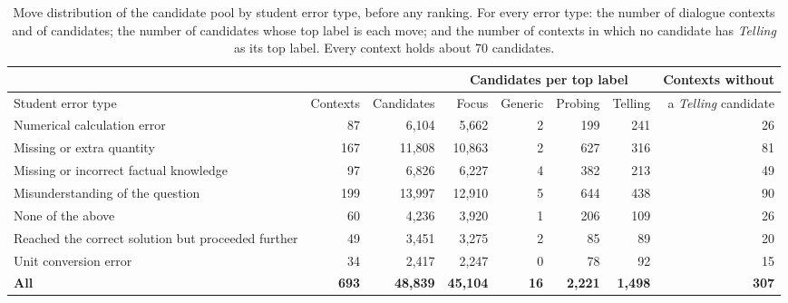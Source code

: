 \begin{table}[!t]
    \centering
    \footnotesize
    \setlength{\tabcolsep}{4pt}
    \renewcommand{\arraystretch}{1.08}
    \captionsetup{skip=4pt}
    \begin{tabularx}{\linewidth}{@{}>{\raggedright\arraybackslash}Xrrrrrrr@{}}
        \toprule
        & & & \multicolumn{4}{c}{Candidates per top label} & Contexts without \\
        \cmidrule(lr){4-7}
        Student error type & Contexts & Candidates & Focus & Generic & Probing & Telling & a \textit{Telling} candidate \\
        \midrule
        Numerical calculation error & 87 & 6,104 & 5,662 & 2 & 199 & 241 & 26 \\
        Missing or extra quantity & 167 & 11,808 & 10,863 & 2 & 627 & 316 & 81 \\
        Missing or incorrect factual knowledge & 97 & 6,826 & 6,227 & 4 & 382 & 213 & 49 \\
        Misunderstanding of the question & 199 & 13,997 & 12,910 & 5 & 644 & 438 & 90 \\
        None of the above & 60 & 4,236 & 3,920 & 1 & 206 & 109 & 26 \\
        Reached the correct solution but proceeded further & 49 & 3,451 & 3,275 & 2 & 85 & 89 & 20 \\
        Unit conversion error & 34 & 2,417 & 2,247 & 0 & 78 & 92 & 15 \\
        \midrule
        \textbf{All} & \textbf{693} & \textbf{48,839} & \textbf{45,104} & \textbf{16} & \textbf{2,221} & \textbf{1,498} & \textbf{307} \\
        \bottomrule
    \end{tabularx}
    \caption{Move distribution of the candidate pool by student error type, before any ranking. For every error type: the number of dialogue contexts and of candidates; the number of candidates whose top label is each move; and the number of contexts in which no candidate has \textit{Telling} as its top label. Every context holds about 70 candidates.}
    \label{tab:candidate_pool}
\end{table}
